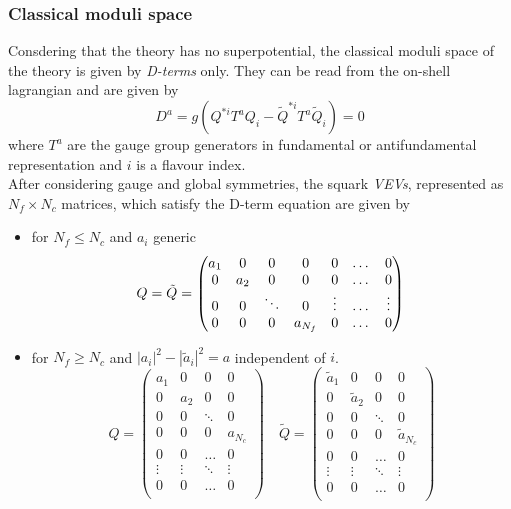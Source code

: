 \subsubsection{Classical moduli space}
Consdering that the theory has no superpotential, the classical moduli space of the theory is given by \emph{D-terms} only. 
They can be read from the on-shell lagrangian and are given by
\begin{equation}
 D^a = g \left( Q^{*i} T^a Q_i - \tilde{Q}^{* i} T^a \tilde{Q}_i \right) = 0
\end{equation}
where $T^a$ are the gauge group generators in fundamental or antifundamental representation and $i$ is a flavour index.
\\
After considering gauge and global symmetries, the squark \emph{VEVs}, represented as $N_f \times N_c$ matrices, which satisfy the D-term equation are given by
\begin{itemize}
\item for $N_f \le N_c$ and $a_i$ generic
\begin{equation}
Q = \tilde{Q} = 
\begin{pmatrix}
 a_1 & 	0	& 0	 & 0	 & 0 & \dots & 0 \\
	 0 & a_2  &  0 	 & 0	 & 0 & \dots & 0 \\  	
 	0 & 	 0	&	\ddots &	0 &\vdots & \dots & \vdots  \\
	 0 & 0  &  0	 & 	a_{N_f}  & 0 &\dots & 0
\end{pmatrix} 
 \\
\end{equation}
\item for $N_f \geq N_c$ and $ | a_i|^2 - | \tilde{a}_i |^2 = a $ independent of $i$.
\begin{equation}
Q  = 
\begin{pmatrix} 
	 a_1 & 		0& 0  & 0 	  \\
	 0& a_2  & 0 	 & 	 0\\  	
 	 0&  		0&	\ddots &	 0   \\
	 0 & 0 & 	0  & 	a_{N_c}  \\
	 0& 0 & \dots & 0 \\ 
	 \vdots & \vdots & \ddots &\vdots \\ 
	 0 & 0 & \dots & 0\\ 
\end{pmatrix} 
\quad
\tilde{Q} = 
\begin{pmatrix}
 \tilde{a}_1 & 		0& 0  & 0 	  \\
	 0& \tilde{a}_2  & 0 	 & 	 0\\  	
 	 0&  		0&	\ddots &	 0   \\
	 0 & 0 & 	0  & 	\tilde{a}_{N_c}  \\
	 0& 0 & \dots & 0 \\ 
	 \vdots & \vdots & \ddots &\vdots \\ 
	 0 & 0 & \dots & 0\\ 
\end{pmatrix} 
\end{equation}
\end{itemize}

